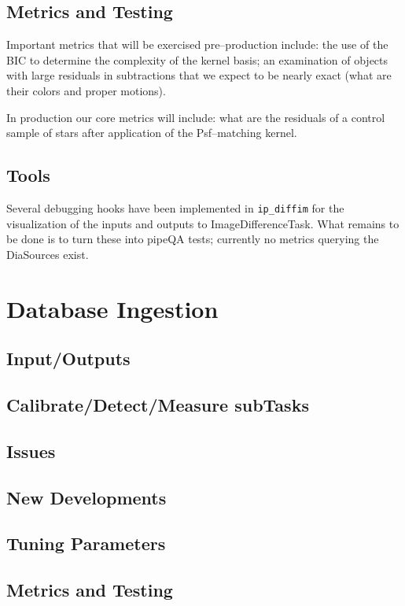 \documentclass[12pt]{article}
\begin{document}
\subsection{Metrics and Testing}

Important metrics that will be exercised pre--production include: the
use of the BIC to determine the complexity of the kernel basis; an
examination of objects with large residuals in subtractions that we
expect to be nearly exact (what are their colors and proper motions).

In production our core metrics will include: what are the residuals of
a control sample of stars after application of the Psf--matching
kernel.

\subsection{Tools}
Several debugging hooks have been implemented in {\tt ip\_diffim} for
the visualization of the inputs and outputs to ImageDifferenceTask.
What remains to be done is to turn these into pipeQA tests; currently
no metrics querying the DiaSources exist.


\clearpage 
\section{Database Ingestion} 

\subsection{Input/Outputs}
\subsection{Calibrate/Detect/Measure subTasks}
\subsection{Issues}
\subsection{New Developments}
\subsection{Tuning Parameters}
\subsection{Metrics and Testing}
\end{document}
